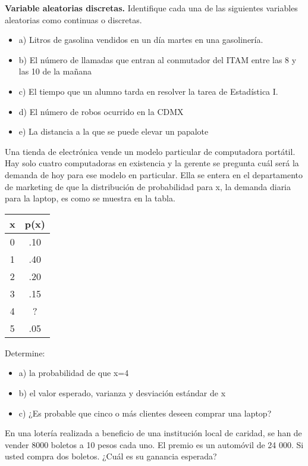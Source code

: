 \documentclass{oxmathproblems}
\begin{document}
\begin{questions}


\miquestion \textbf {Variable aleatorias discretas.}
Identifique cada una de las siguientes variables aleatorias como continuas o discretas. 
\begin{itemize}
\item  a) Litros de gasolina vendidos en un día martes en una gasolinería. 
\item  b) El número de llamadas que entran al conmutador del ITAM entre las 8 y las 10 de la mañana
\item  c) El tiempo que un alumno tarda en resolver la tarea de Estadística I. 
\item  d) El número de robos ocurrido en la CDMX 
\item  e) La distancia a la que se puede elevar un papalote
\end{itemize}

\miquestion Una tienda de electrónica vende un modelo particular de computadora portátil. Hay solo cuatro computadoras en existencia y la gerente se pregunta cuál será la demanda de hoy para ese modelo en particular. Ella se entera en el departamento de marketing de que la distribución de probabilidad para x, la demanda diaria para la laptop, es como se muestra en la tabla.  

\begin{center}
\begin{tabular}{ |c|c| } 
 \hline
 \textbf{x} & \textbf{p(x)} \\ 
 \hline
 0 & .10 \\
 1  & .40 \\
2 & .20\\ 
 3 & .15 \\ 
4 & ? \\ 
5 & .05 \\ 
 \hline
\end{tabular}
\end{center}
 Determine:   
\begin{itemize}
\item  a) la probabilidad de que x=4
\item  b) el valor esperado, varianza y desviación estándar de x
\item  c) ¿Es probable que cinco o más clientes deseen comprar una laptop?
\end{itemize}


\miquestion En una lotería realizada a beneficio de una institución local de caridad, se han de vender 8000 boletos a 10 pesos cada uno. El premio es un automóvil de 24 000. Si usted compra dos boletos. ¿Cuál es su ganancia esperada?


\end{questions}
\end{document}
